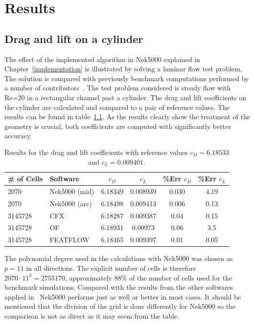 
\chapter{Results} %

\label{results} %



\section{Drag and lift on a cylinder}
The effect of the implemented algorithm in Nek5000 explained in Chapter~\ref{implementation} is
illustrated by solving a laminar flow test problem. 
The solution is compared with previously benchmark computations performed by a number of 
contributors~\cite{benchmark}. The test problem considered is steady flow with Re=20 in 
a rectangular channel past a cylinder. The drag and lift coefficients on the cylinder 
are calculated and compared to a pair of reference values. The results can be found in 
table~\ref{tab:testcase}. As the results clearly show the treatment of the geometry is 
crucial, both coefficients are computed with significantly better accuracy. 
%
\begin{table}
\centering
\begin{tabular}{l l c c c c}
		\toprule
		\# of Cells & Software & $c_D$ & $c_L$ & \%\textbf{Err} $c_D$ &\%\textbf{Err} $c_L$ \\ \midrule 
		2070 & Nek5000 (mid) & 6.18349 & 0.008939 & 0.030 & 4.19 \\ 
		2070 & Nek5000 (arc) & 6.18498 & 0.009413 & 0.006 & 0.13 \\
		3145728 & CFX 		 & 6.18287 & 0.009387 & 0.04 &0.15 \\
		3145728 & OF	     & 6.18931 & 0.00973 & 0.06 &3.5 \\
		3145728 & FEATFLOW   & 6.18465 & 0.009397 & 0.01 &0.05 \\
		\bottomrule	
	\end{tabular}
	\caption{Results for the drag and lift coefficients with reference values 
	$c_D = 6.18533$ and $c_L = 0.009401$.}
\label{tab:testcase}
\end{table}
%
The polynomial degree used in the calculations with Nek5000 was chosen as $p = 11 $ 
in all directions. The explicit number of cells is therefore $2070\cdot11^{3} = 2755170$,
approximately $88\%$ of the number of cells used for the benchmark simulations. Compared 
with the results from the other softwares applied in~\cite{benchmark} Nek5000 performs 
just as well or better in most cases. It should be mentioned that the division of the grid is done 
differently for Nek5000 so the comparison is not as direct as it may seem from the table.

